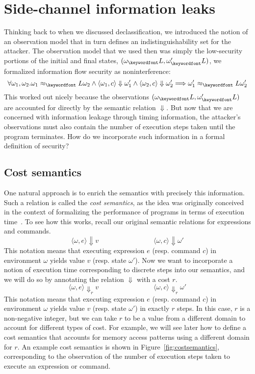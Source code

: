 \documentclass[11pt,twoside]{scrartcl}
\begin{document}
\section{Side-channel information leaks}

Thinking back to when we discussed declassification, we introduced the notion of an observation model that in turn defines an indistinguishability set for the attacker. The observation model that we used then was simply the low-security portions of the initial and final states, $(\omega_\lowt, \omega'_\lowt)$, we formalized information flow security as noninterference:
\begin{equation}
\label{eq:nonint}
\forall \omega_1,\omega_2 . \omega_1 \approx_\lowt \omega_2 \land \langle \omega_1, c\rangle \Downarrow \omega_1' \land \langle\omega_2, c\rangle\Downarrow\omega_2' \Longrightarrow \omega_1' \approx_\lowt \omega_2'
\end{equation}
This worked out nicely because the observations $(\omega_\lowt, \omega'_\lowt)$ are accounted for directly by the semantic relation $\Downarrow$. But now that we are concerned with information leakage through timing information, the attacker's observations must also contain the number of execution steps taken until the program terminates. How do we incorporate such information in a formal definition of security?

\subsection{Cost semantics}
One natural approach is to enrich the semantics with precisely this information. Such a relation is called the \emph{cost semantics}, as the idea was originally conceived in the context of formalizing the performance of programs in terms of execution time~\cite{Hoffmann11}. To see how this works, recall our original semantic relations for expressions and commands.
\[
\langle \omega, e\rangle \Downarrow v
\quad\quad\quad\quad\quad\quad\quad\quad
\langle \omega, c\rangle \Downarrow \omega'
\]
This notation means that executing expression $e$ (resp. command $c$) in environment $\omega$ yields value $v$ (resp. state $\omega'$). Now we want to incorporate a notion of execution time corresponding to discrete steps into our semantics, and we will do so by annotating the relation $\Downarrow$ with a cost $r$.
\[
\langle \omega, e\rangle \Downarrow_r v
\quad\quad\quad\quad\quad\quad\quad\quad
\langle \omega, c\rangle \Downarrow_r \omega'
\]
This notation means that executing expression $e$ (resp. command $c$) in environment $\omega$ yields value $v$ (resp. state $\omega'$) in exactly $r$ steps. In this case, $r$ is a non-negative integer, but we can take $r$ to be a value from a different domain to account for different types of cost. For example, we will see later how to define a cost semantics that accounts for memory access patterns using a different domain for $r$.
An example cost semantics is shown in Figure~\ref{fig:costsemantics}, corresponding to the observation of the number of execution steps taken to execute an expression or command. 
\end{document}
